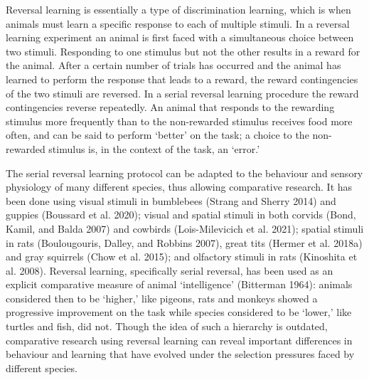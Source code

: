 \documentclass[
]{article}
\begin{document}
Reversal learning is essentially a type of discrimination learning, which is when animals must learn a specific response to each of multiple stimuli. In a reversal learning experiment an animal is first faced with a simultaneous choice between two stimuli. Responding to one stimulus but not the other results in a reward for the animal. After a certain number of trials has occurred and the animal has learned to perform the response that leads to a reward, the reward contingencies of the two stimuli are reversed. In a serial reversal learning procedure the reward contingencies reverse repeatedly. An animal that responds to the rewarding stimulus more frequently than to the non-rewarded stimulus receives food more often, and can be said to perform `better' on the task; a choice to the non-rewarded stimulus is, in the context of the task, an `error.'

The serial reversal learning protocol can be adapted to the behaviour and sensory physiology of many different species, thus allowing comparative research. It has been done using visual stimuli in bumblebees (Strang and Sherry 2014) and guppies (Boussard et al. 2020); visual and spatial stimuli in both corvids (Bond, Kamil, and Balda 2007) and cowbirds (Lois-Milevicich et al. 2021); spatial stimuli in rats (Boulougouris, Dalley, and Robbins 2007), great tits (Hermer et al. 2018a) and gray squirrels (Chow et al. 2015); and olfactory stimuli in rats (Kinoshita et al. 2008). Reversal learning, specifically serial reversal, has been used as an explicit comparative measure of animal `intelligence' (Bitterman 1964): animals considered then to be `higher,' like pigeons, rats and monkeys showed a progressive improvement on the task while species considered to be `lower,' like turtles and fish, did not. Though the idea of such a hierarchy is outdated, comparative research using reversal learning can reveal important differences in behaviour and learning that have evolved under the selection pressures faced by different species.
\end{document}
